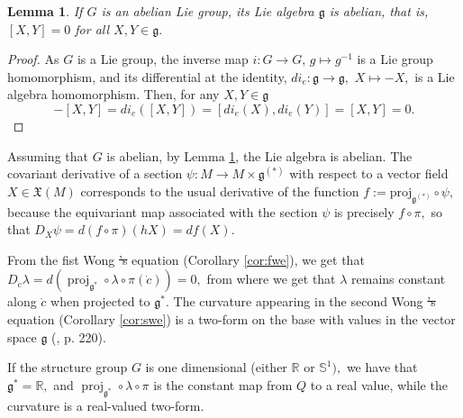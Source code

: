 \documentclass[12pt, letterpaper, reqno]{amsart}
\theoremstyle{definition}
\theoremstyle{plain}
\newtheorem{lm}{Lemma}
\theoremstyle{remark}
\providecommand{\DIFadd}[1]{{\protect\color{blue}\uwave{#1}}} %
\providecommand{\DIFdel}[1]{{\protect\color{red}\sout{#1}}}                      %
\providecommand{\DIFaddbegin}{} %
\providecommand{\DIFaddend}{} %
\providecommand{\DIFdelbegin}{} %
\providecommand{\DIFdelend}{} %
\newcommand{\DIFscaledelfig}{0.5}
\newlength{\DIFdelgraphicswidth} %
\newlength{\DIFdelgraphicsheight} %
\newcommand{\DIFaddincludegraphics}[2][]{{\color{blue}\fbox{\DIFOincludegraphics[#1]{#2}}}} %
\newcommand{\DIFdelincludegraphics}[2][]{%
\sbox{\DIFdelgraphicsbox}{\DIFOincludegraphics[#1]{#2}}%
\settoboxwidth{\DIFdelgraphicswidth}{\DIFdelgraphicsbox} %
\settoboxtotalheight{\DIFdelgraphicsheight}{\DIFdelgraphicsbox} %
\scalebox{\DIFscaledelfig}{%
\parbox[b]{\DIFdelgraphicswidth}{\usebox{\DIFdelgraphicsbox}\\[-\baselineskip] \rule{\DIFdelgraphicswidth}{0em}}\llap{\resizebox{\DIFdelgraphicswidth}{\DIFdelgraphicsheight}{%
\setlength{\unitlength}{\DIFdelgraphicswidth}%
\begin{picture}(1,1)%
\thicklines\linethickness{2pt} %
{\color[rgb]{1,0,0}\put(0,0){\framebox(1,1){}}}%
{\color[rgb]{1,0,0}\put(0,0){\line( 1,1){1}}}%
{\color[rgb]{1,0,0}\put(0,1){\line(1,-1){1}}}%
\end{picture}%
}\hspace*{3pt}}} %
} %
\DeclareRobustCommand{\DIFaddbegin}{\DIFOaddbegin \let\includegraphics\DIFaddincludegraphics} %
\DeclareRobustCommand{\DIFaddend}{\DIFOaddend \let\includegraphics\DIFOincludegraphics} %
\DeclareRobustCommand{\DIFdelbegin}{\DIFOdelbegin \let\includegraphics\DIFdelincludegraphics} %
\DeclareRobustCommand{\DIFdelend}{\DIFOaddend \let\includegraphics\DIFOincludegraphics} %
\begin{document}
\begin{lm}\label{lm:minus_inverse}
	If $ G $ is an abelian Lie group, its Lie algebra $ \mathfrak{g} $ is abelian, that is, $ [X,Y]=0 $ for all $ X,Y\in \mathfrak{g}. $ 
\end{lm}
\begin{proof}
	As $ G $ is a Lie group, the inverse map $ i : G \rightarrow G $, $ g \mapsto g^{-1} $ is a Lie group homomorphism, and its differential at the identity, $di_e: \mathfrak{g} \rightarrow \mathfrak{g},  $ $ X \mapsto -X, $ is a Lie algebra homomorphism. Then, for any $ X,Y\in \mathfrak{g} $ 
	$$ -[X,Y] = di_e([X,Y]) = [di_e(X), di_e(Y)] = [X,Y]=0. $$ 
\end{proof}

Assuming that $ G$ is abelian, by Lemma \ref{lm:minus_inverse}, the \DIFaddbegin \DIFadd{(dual) }\DIFaddend Lie algebra is abelian. The covariant derivative  of a section \DIFdelbegin \DIFdel{$ \psi: M \rightarrow M\times \mathfrak{g}^{(*)} $ }\DIFdelend \DIFaddbegin \DIFadd{$ \psi: M \rightarrow M\times \mathfrak{g}^{*} $ }\DIFaddend with respect to a vector field $ X\in \mathfrak{X}(M) $ corresponds to the usual derivative of the function \DIFdelbegin \DIFdel{$f:= \operatorname{proj_{ \mathfrak{g}^{(*)}}}\circ \psi,$ }\DIFdelend \DIFaddbegin \DIFadd{$f:= \operatorname{proj_{ \mathfrak{g}^*}}\circ \psi,$ }\DIFaddend because the equivariant map associated with the section $ \psi $ is precisely $ f\circ\pi, $ so that $ D_X\psi=d(f\circ\pi)(hX) = df(X). $ 

From the fist Wong \DIFdelbegin \DIFdel{'s }\DIFdelend equation (Corollary \ref{cor:fwe}), we get that $ D_{\dot{c}}\lambda = d( \operatorname{proj}_{ \mathfrak{g}^*}\circ \lambda\circ\pi(\dot{c}))=0, $ from where we get that $ \lambda $ remains constant along $ \dot{c} $ when projected to $ \mathfrak{g}^{*}. $ The curvature appearing in the second Wong \DIFdelbegin \DIFdel{'s }\DIFdelend equation (Corollary \ref{cor:swe}) is a two-form on the base with values in the vector space $ \mathfrak{g} $ (\cite{montgomery2002tour}, p. 220).

If the structure group $ G $ is one dimensional (either $ \mathbb{R} $ or $ \mathbb{S}^1), $ we have that $ \mathfrak{g}^*= \mathbb{R}, $ and $ \operatorname{proj}_{ \mathfrak{g}^*} \circ\lambda\circ\pi $ is the constant map from $ Q $ to a real value, while the curvature is a real-valued two-form.
\end{document}
